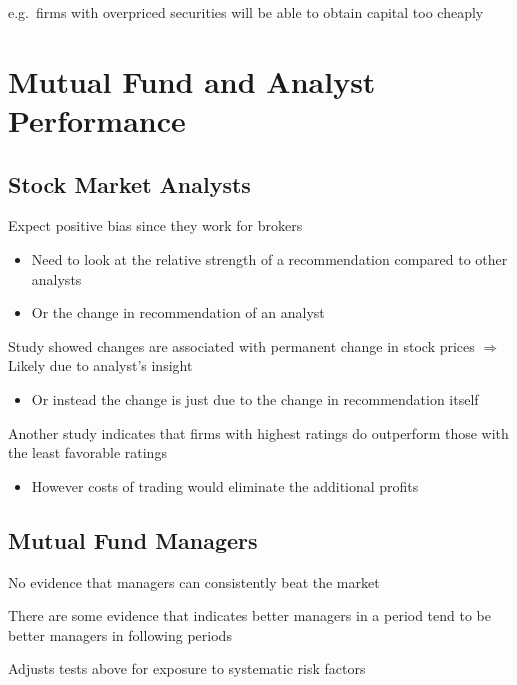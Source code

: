 \documentclass[]{book}
\providecommand{\tightlist}{%
  \setlength{\itemsep}{0pt}\setlength{\parskip}{0pt}}
\theoremstyle{definition}
\theoremstyle{definition}
\theoremstyle{remark}
\begin{document}
e.g.~firms with overpriced securities will be able to obtain capital too
cheaply

\section{Mutual Fund and Analyst
Performance}\label{mutual-fund-and-analyst-performance}

\subsection{Stock Market Analysts}\label{stock-market-analysts}

Expect positive bias since they work for brokers

\begin{itemize}
\item
  Need to look at the relative strength of a recommendation compared to
  other analysts
\item
  Or the change in recommendation of an analyst
\end{itemize}

Study showed changes are associated with permanent change in stock
prices \(\Rightarrow\) Likely due to analyst's insight

\begin{itemize}
\tightlist
\item
  Or instead the change is just due to the change in recommendation
  itself
\end{itemize}

Another study indicates that firms with highest ratings do outperform
those with the least favorable ratings

\begin{itemize}
\tightlist
\item
  However costs of trading would eliminate the additional profits
\end{itemize}

\subsection{Mutual Fund Managers}\label{mutual-fund-managers}

No evidence that managers can consistently beat the market

There are some evidence that indicates better managers in a period tend
to be better managers in following periods

Adjusts tests above for exposure to systematic risk factors
\end{document}
